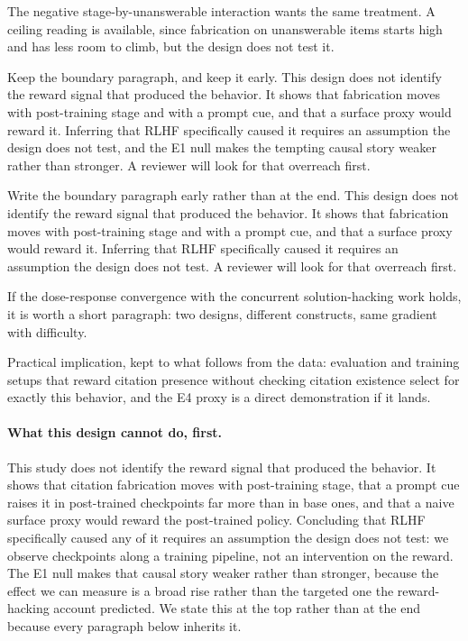 {The negative stage-by-unanswerable interaction wants the same treatment. A
ceiling reading is available, since fabrication on unanswerable items starts
high and has less room to climb, but the design does not test it.

Keep the boundary paragraph, and keep it early. This design does not identify
the reward signal that produced the behavior. It shows that fabrication moves
with post-training stage and with a prompt cue, and that a surface proxy would
reward it. Inferring that RLHF specifically caused it requires an assumption the
design does not test, and the E1 null makes the tempting causal story weaker
rather than stronger. A reviewer will look for that overreach first.

Write the boundary paragraph early rather than at the end. This design does not
identify the reward signal that produced the behavior. It shows that fabrication
moves with post-training stage and with a prompt cue, and that a surface proxy
would reward it. Inferring that RLHF specifically caused it requires an
assumption the design does not test. A reviewer will look for that
overreach first.

If the dose-response convergence with the concurrent solution-hacking work
holds, it is worth a short paragraph: two designs, different constructs, same
gradient with difficulty.

Practical implication, kept to what follows from the data: evaluation and
training setups that reward citation presence without checking citation
existence select for exactly this behavior, and the E4 proxy is a direct
demonstration if it lands.}

\paragraph{What this design cannot do, first.}
This study does not identify the reward signal that produced the behavior. It
shows that citation fabrication moves with post-training stage, that a prompt cue
raises it in post-trained checkpoints far more than in base ones, and that a
naive surface proxy would reward the post-trained policy.
Concluding that RLHF specifically caused any of it requires an assumption the
design does not test: we observe checkpoints along a training pipeline, not an
intervention on the reward. The E1 null makes that causal story weaker rather
than stronger, because the effect we can measure is a broad rise rather than the
targeted one the reward-hacking account predicted. We state this at the top
rather than at the end because every paragraph below inherits it.

